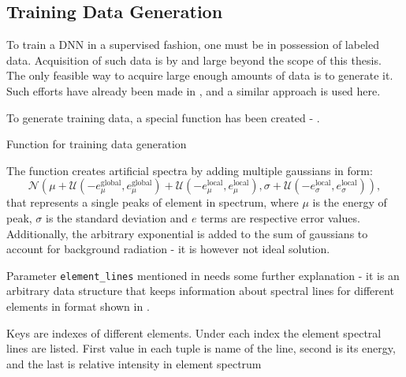 \subsection{Training Data Generation}
To train a DNN in a supervised fashion, one must be in possession of labeled data. 
Acquisition of such data is by and large beyond the scope of this thesis. 
The only feasible way to acquire large enough amounts of data is to generate it. 
Such efforts have already been made in \cite{Jones2022}, and a similar approach is used here.

To generate training data, a special function has been created - . 

\newenvironment{longlistingD}{\captionsetup{type=listing, width=0.8\textwidth}}{}
\begin{longlistingD}
    \caption{Function for training data generation}
    \label{lst:data_generation}
\end{longlistingD}
\vspace{12pt}

The function creates artificial spectra by adding multiple gaussians in form: \[\mathcal{N}(\mu + \mathcal{U}(-e_\mu^{\text{global}}, e_\mu^{\text{global}}) + \mathcal{U}(-e_\mu^{\text{local}}, e_\mu^{\text{local}}), \sigma + \mathcal{U}(-e_\sigma^{\text{local}}, e_\sigma^{\text{local}})),\]
that represents a single peaks of element in spectrum, where $\mu$ is the energy of peak, $\sigma$ is the standard deviation and $e$ terms are respective error values. Additionally, the arbitrary exponential is added to the sum of gaussians to account for background radiation - it is however not ideal solution.

Parameter \texttt{element\_lines} mentioned in  needs some further explanation - it is an arbitrary data structure that keeps information about spectral lines for different elements in format shown in .

\newenvironment{longlistingE}{\captionsetup{type=listing, width=0.8\textwidth}}{}
\begin{longlistingE}
    \caption{Keys are indexes of different elements. Under each index the element spectral lines are listed. First value in each tuple is name of the line, second is its energy, and the last is relative intensity in element spectrum}
    \label{lst:element_lines}
\end{longlistingE}
\vspace{12pt}

